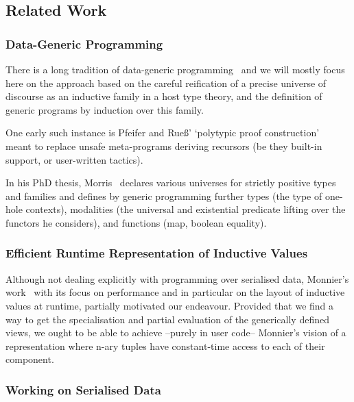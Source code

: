 
\subsection{Related Work}

\subsubsection{Data-Generic Programming}

There is a long tradition of data-generic
programming~\cite{DBLP:conf/ssdgp/Gibbons06} and we will mostly focus here
on the approach based on the careful reification of a precise universe of
discourse as an inductive family in a host type theory,
and the definition of generic programs by induction over this family.

One early such instance is Pfeifer and Rue{\ss}'
`polytypic proof construction'~\cite{DBLP:conf/tphol/PfeiferR99}
meant to replace unsafe meta-programs deriving recursors
(be they built-in support, or user-written tactics).


In his PhD thesis, Morris~\cite{DBLP:phd/ethos/Morris07} declares various
universes for strictly positive types and families and defines by generic
programming
further types (the type of one-hole contexts),
modalities (the universal and existential predicate lifting over the functors he considers),
and functions (map, boolean equality).



\subsubsection{Efficient Runtime Representation of Inductive Values}

Although not dealing explicitly with programming over serialised data,
Monnier's work~\cite{DBLP:conf/icfp/Monnier19} with its focus on performance and
in particular on the layout of inductive values at runtime,
partially motivated our endeavour.
%
Provided that we find a way to get the specialisation and partial evaluation
of the generically defined views, we ought to be able to achieve --purely in
user code-- Monnier's vision of a representation where n-ary tuples have
constant-time access to each of their component.

\subsubsection{Working on Serialised Data}

